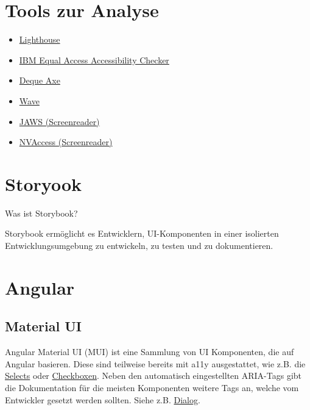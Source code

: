 \section{Tools zur Analyse}

\begin{itemize}
    \item \href{https://developers.google.com/web/tools/lighthouse/#devtools}{Lighthouse}
    \item \href{https://chrome.google.com/webstore/detail/ibm-equal-access-accessib/lkcagbfjnkomcinoddgooolagloogehp?hl=en-US}{IBM Equal Access Accessibility Checker}
    \item \href{https://www.deque.com/axe/}{Deque Axe}
    \item \href{https://wave.webaim.org/extension/}{Wave}
    \item \href{https://support.freedomscientific.com/Downloads/JAWS}{JAWS (Screenreader)}
    \item \href{https://www.nvaccess.org/download/}{NVAccess (Screenreader)}
\end{itemize}

\section{Storyook}

Was ist Storybook?

Storybook ermöglicht es Entwicklern, UI-Komponenten in einer isolierten Entwicklungsumgebung zu entwickeln, zu testen und zu dokumentieren. \cite{storybook_storybook_nodate}

\section{Angular}

\subsection{Material UI}

Angular Material UI (MUI) ist eine Sammlung von UI Komponenten, die auf Angular basieren. \cite{angular_components_team_angular_nodate} Diese sind teilweise bereits mit a11y ausgestattet, wie z.B. die \href{https://material.angular.io/components/select/overview#accessibility}{Selects} oder \href{https://material.angular.io/components/checkbox/overview#accessibility}{Checkboxen}. Neben den automatisch eingestellten ARIA-Tags gibt die Dokumentation für die meisten Komponenten weitere Tags an, welche vom Entwickler gesetzt werden sollten. Siehe z.B. \href{https://material.angular.io/components/dialog/overview#accessibility}{Dialog}.

